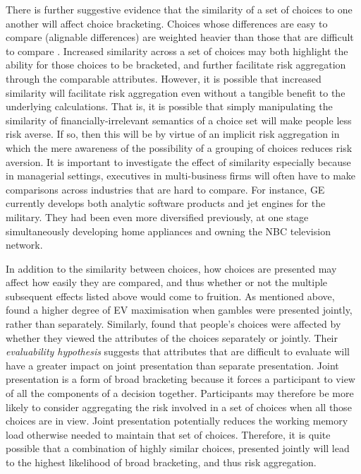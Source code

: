 \documentclass[a4paper, nobind]{templates/ociamthesis}
\theoremstyle{definition}
\theoremstyle{definition}
\theoremstyle{definition}
\theoremstyle{definition}
\theoremstyle{remark}
\begin{document}
There is further suggestive evidence that the similarity of a set of choices to
one another will affect choice bracketing. Choices whose differences are easy to
compare (alignable differences) are weighted heavier than those that are
difficult to compare \autocite{markman1995,markman2010}. Increased similarity across a
set of choices may both highlight the ability for those choices to be bracketed,
and further facilitate risk aggregation through the comparable attributes.
However, it is possible that increased similarity will facilitate risk
aggregation even without a tangible benefit to the underlying calculations. That
is, it is possible that simply manipulating the similarity of
financially-irrelevant semantics of a choice set will make people less risk
averse. If so, then this will be by virtue of an implicit risk aggregation in
which the mere awareness of the possibility of a grouping of choices reduces
risk aversion. It is important to investigate the effect of similarity
especially because in managerial settings, executives in multi-business firms
will often have to make comparisons across industries that are hard to compare.
For instance, GE currently develops both analytic software products and jet
engines for the military. They had been even more diversified previously, at one
stage simultaneously developing home appliances and owning the NBC television
network.

In addition to the similarity between choices, how choices are presented may
affect how easily they are compared, and thus whether or not the multiple
subsequent effects listed above would come to fruition. As mentioned above,
\textcite{haisley2008} found a higher degree of EV maximisation when gambles were
presented jointly, rather than separately. Similarly, \textcite{hsee1999} found that
people's choices were affected by whether they viewed the attributes of the
choices separately or jointly. Their \emph{evaluability hypothesis} suggests that
attributes that are difficult to evaluate will have a greater impact on joint
presentation than separate presentation. Joint presentation is a form of broad
bracketing because it forces a participant to view of all the components of a
decision together. Participants may therefore be more likely to consider
aggregating the risk involved in a set of choices when all those choices are in
view. Joint presentation potentially reduces the working memory load otherwise
needed to maintain that set of choices. Therefore, it is quite possible that a
combination of highly similar choices, presented jointly will lead to the
highest likelihood of broad bracketing, and thus risk aggregation.
\end{document}
